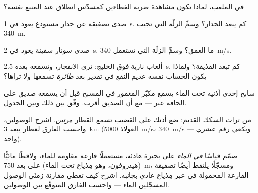 \begin{exercise}[$\star$]\label{exo:g7:sound-production:6}
في  الملعب، لماذا تكون مشاهدة ضربة الغطاءين كمسدّس انطلاق
عند المنبع نفسه؟
\end{exercise}

\begin{exercise}[$\star$]\label{exo:g7:sound-production:7}
صدى تصفيقة عن جدار مستودع يعود في \qty{1}{s}. كم يبعد الجدار؟
وسمِّ الزلّة التي تجيب \qty{340}{m}.
\end{exercise}

\begin{exercise}[$\star$]\label{exo:g7:sound-production:8}
صدى سونار سفينة يعود في \qty{2}{s}. ما العمق؟ وسمِّ الزلّة التي
تستعمل \qty{340}{m/s}.
\end{exercise}

\begin{exercise}[$\star\star$]\label{exo:g7:sound-production:9}
ألعاب نارية فوق الخليج: ترى الانفجار، وتسمعه بعده
\qty{2.5}{s}. كم تبعد القذيفة؟ ولماذا يكون الحساب نفسه عديم
النفع في تقدير بعد \emph{طائرة} تسمعها ولا تراها؟
\end{exercise}

\begin{exercise}[$\star\star$]\label{exo:g7:sound-production:10}
سابح إحدى أذنيه تحت الماء يسمع مكبّر  المغمور في المسبح
قبل أن يسمعه صديق على الحافة عبر  --- مع أن الصديق أقرب.
وفّق بين ذلك وبين الجدول.
\end{exercise}

\begin{exercise}[$\star\star$]\label{exo:g7:sound-production:11}
من تراث السكك القديم: ضع أذنك على القضيب تسمع القطار
\emph{مرتين}. اشرح الوصولين، واحسب الفارق لقطار يبعد
\qty{3}{km} (الفولاذ  \qty{5000}{m/s}،  
\qty{340}{m/s} --- ويكفي رقم عشري واحد).
\end{exercise}

\begin{exercise}[$\star\star\star$]\label{exo:g7:sound-production:12}
صمّم قياسًا   \emph{في الماء} على بحيرة هادئة،
مستعملًا قارعة مقاومة للماء، ولاقطًا مائيًّا (هيدروفون، وهو
مِذياع تحت الماء) على بعد \qty{750}{m}، ومسجّلًا يلتقط أيضًا
تصفيقة القارعة المحمولة في  عبر مِذياع عادي بجانبه. اشرح
كيف تعطي مقارنة زمنَي الوصول المسجّلين  الماء --- واحسب
الفارق المتوقّع بين الوصولين.
\end{exercise}

